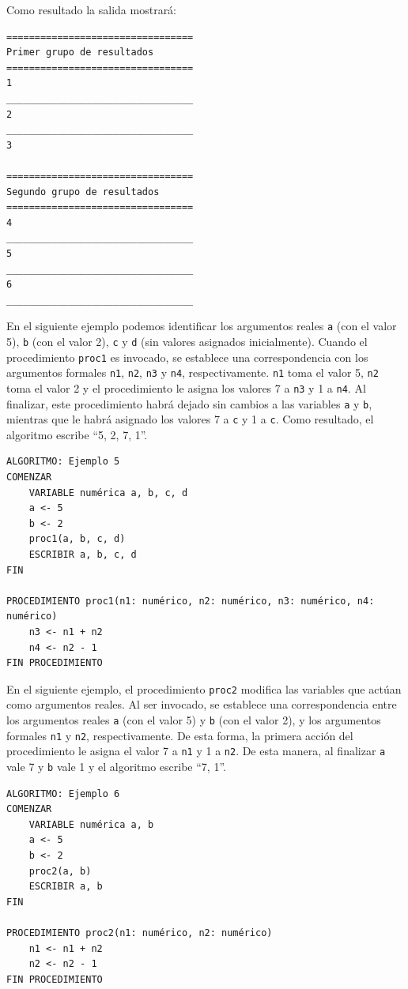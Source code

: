\documentclass[]{book}
\begin{document}
Como resultado la salida mostrará:

\begin{verbatim}
=================================
Primer grupo de resultados
=================================
1
_________________________________
2
_________________________________
3

=================================
Segundo grupo de resultados
=================================
4
_________________________________
5
_________________________________
6
_________________________________
\end{verbatim}

En el siguiente ejemplo podemos identificar los argumentos reales
\texttt{a} (con el valor 5), \texttt{b} (con el valor 2), \texttt{c} y
\texttt{d} (sin valores asignados inicialmente). Cuando el procedimiento
\texttt{proc1} es invocado, se establece una correspondencia con los
argumentos formales \texttt{n1}, \texttt{n2}, \texttt{n3} y \texttt{n4},
respectivamente. \texttt{n1} toma el valor 5, \texttt{n2} toma el valor
2 y el procedimiento le asigna los valores 7 a \texttt{n3} y 1 a
\texttt{n4}. Al finalizar, este procedimiento habrá dejado sin cambios a
las variables \texttt{a} y \texttt{b}, mientras que le habrá asignado
los valores 7 a \texttt{c} y 1 a \texttt{c}. Como resultado, el
algoritmo escribe ``5, 2, 7, 1''.

\begin{verbatim}
ALGORITMO: Ejemplo 5
COMENZAR
    VARIABLE numérica a, b, c, d
    a <- 5
    b <- 2
    proc1(a, b, c, d)
    ESCRIBIR a, b, c, d
FIN

PROCEDIMIENTO proc1(n1: numérico, n2: numérico, n3: numérico, n4: numérico)
    n3 <- n1 + n2
    n4 <- n2 - 1
FIN PROCEDIMIENTO
\end{verbatim}

En el siguiente ejemplo, el procedimiento \texttt{proc2} modifica las
variables que actúan como argumentos reales. Al ser invocado, se
establece una correspondencia entre los argumentos reales \texttt{a}
(con el valor 5) y \texttt{b} (con el valor 2), y los argumentos
formales \texttt{n1} y \texttt{n2}, respectivamente. De esta forma, la
primera acción del procedimiento le asigna el valor 7 a \texttt{n1} y 1
a \texttt{n2}. De esta manera, al finalizar \texttt{a} vale 7 y
\texttt{b} vale 1 y el algoritmo escribe ``7, 1''.

\begin{verbatim}
ALGORITMO: Ejemplo 6
COMENZAR
    VARIABLE numérica a, b
    a <- 5
    b <- 2
    proc2(a, b)
    ESCRIBIR a, b
FIN

PROCEDIMIENTO proc2(n1: numérico, n2: numérico)
    n1 <- n1 + n2
    n2 <- n2 - 1
FIN PROCEDIMIENTO
\end{verbatim}
\end{document}
